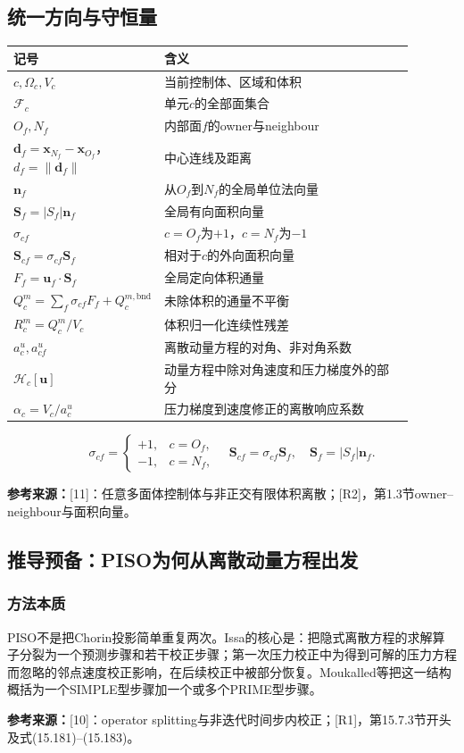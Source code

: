 \documentclass[UTF8,12pt,a4paper]{ctexart}
\numberwithin{equation}{section}
\newcommand{\Issa}{\textnormal{[10]}}
\newcommand{\Jasak}{\textnormal{[11]}}
\newcommand{\Rone}{\textnormal{[R1]}}
\newcommand{\Rtwo}{\textnormal{[R2]}}
\newcommand{\source}[1]{\par\smallskip\noindent\colorbox{sourcebg}{%
  \parbox{0.955\linewidth}{\footnotesize\color{sourcegray}\textbf{参考来源：}#1}}\par\smallskip}
\begin{document}
\subsection*{统一方向与守恒量}
\begin{longtable}{>{\centering\arraybackslash}p{0.22\linewidth}p{0.67\linewidth}}
\toprule
记号 & 含义\\
\midrule
$c,\Omega_c,V_c$ & 当前控制体、区域和体积\\
$\mathcal F_c$ & 单元$c$的全部面集合\\
$O_f,N_f$ & 内部面$f$的owner与neighbour\\
$\bm d_f=\bm x_{N_f}-\bm x_{O_f}$，$d_f=\lVert\bm d_f\rVert$ & 中心连线及距离\\
$\bm n_f$ & 从$O_f$到$N_f$的全局单位法向量\\
$\bm S_f=|S_f|\bm n_f$ & 全局有向面积向量\\
$\sigma_{cf}$ & $c=O_f$为$+1$，$c=N_f$为$-1$\\
$\bm S_{cf}=\sigma_{cf}\bm S_f$ & 相对于$c$的外向面积向量\\
$F_f=\bm u_f\cdot\bm S_f$ & 全局定向体积通量\\
$Q_c^m=\sum_f\sigma_{cf}F_f+Q_c^{m,\mathrm{bnd}}$ & 未除体积的通量不平衡\\
$R_c^m=Q_c^m/V_c$ & 体积归一化连续性残差\\
$a_c^u,a_{cf}^u$ & 离散动量方程的对角、非对角系数\\
$\mathcal H_c[\bm u]$ & 动量方程中除对角速度和压力梯度外的部分\\
$\alpha_c=V_c/a_c^u$ & 压力梯度到速度修正的离散响应系数\\
\bottomrule
\end{longtable}
\begin{equation}
  \boxed{\sigma_{cf}=\begin{cases}+1,&c=O_f,\\-1,&c=N_f,\end{cases}
  \quad\bm S_{cf}=\sigma_{cf}\bm S_f,\quad\bm S_f=|S_f|\bm n_f.}
  \label{eq:orientation}
\end{equation}
\source{\Jasak：任意多面体控制体与非正交有限体积离散；\Rtwo，第1.3节owner--neighbour与面积向量。}

\subsection*{推导预备：PISO为何从离散动量方程出发}
\subsubsection*{方法本质}
PISO不是把Chorin投影简单重复两次。Issa的核心是：把隐式离散方程的求解算子分裂为一个预测步骤和若干校正步骤；第一次压力校正中为得到可解的压力方程而忽略的邻点速度校正影响，在后续校正中被部分恢复。Moukalled等把这一结构概括为一个SIMPLE型步骤加一个或多个PRIME型步骤。
\source{\Issa：operator splitting与非迭代时间步内校正；\Rone，第15.7.3节开头及式(15.181)--(15.183)。}
\end{document}

